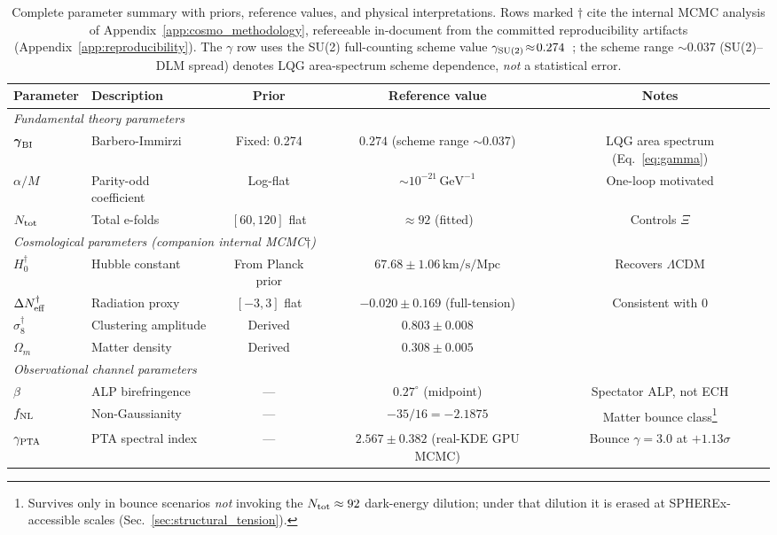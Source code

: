 \documentclass[aps,prd,twocolumn,superscriptaddress,showpacs,preprintnumbers,nofootinbib,longbibliography,floatfix]{revtex4-2}
\newcommand{\Neff}{N_{\rm eff}}
\newcommand{\fnl}{f_{\rm NL}}
\begin{document}
\begin{table}[t]
\caption{\label{tab:params} Complete parameter summary with priors, reference values,
and physical interpretations. Rows marked $\dagger$ cite the internal
MCMC analysis of Appendix~\ref{app:cosmo_methodology}, refereeable in-document
from the committed reproducibility artifacts (Appendix~\ref{app:reproducibility}).
The $\gamma$ row uses the SU(2) full-counting scheme value
$\gamma_{\rm SU(2)}\!\approx\!0.274$~\cite{Domagala2004,Meissner2004}; the scheme range
$\sim\!0.037$ (SU(2)--DLM spread) denotes LQG area-spectrum scheme dependence,
\emph{not} a statistical error.}
\begin{ruledtabular}
\begin{tabular}{llccc}
Parameter & Description & Prior & Reference value & Notes \\
\hline
\multicolumn{5}{l}{\textit{Fundamental theory parameters}} \\
$\boldsymbol{\gamma}_{\rm BI}$ & Barbero-Immirzi & Fixed: 0.274 & $0.274$ (scheme range $\sim\!0.037$) & LQG area spectrum (Eq.~\ref{eq:gamma}) \\
$\alpha/M$ & Parity-odd coefficient & Log-flat & $\sim 10^{-21}\,\text{GeV}^{-1}$ & One-loop motivated \\
$N_{\rm tot}$ & Total e-folds & $[60, 120]$ flat & $\approx 92$ (fitted) & Controls $\Xi$ \\
\hline
\multicolumn{5}{l}{\textit{Cosmological parameters (companion internal MCMC$\dagger$)}} \\
$H_0^\dagger$ & Hubble constant & From Planck prior & $67.68\pm 1.06\,\text{km/s/Mpc}$ & Recovers $\Lambda$CDM \\
$\Delta\Neff^\dagger$ & Radiation proxy & $[-3, 3]$ flat & $-0.020\pm 0.169$ (full-tension) & Consistent with 0 \\
$\sigma_8^\dagger$ & Clustering amplitude & Derived & $0.803\pm 0.008$ & \\
$\Omega_m$ & Matter density & Derived & $0.308\pm 0.005$ & \\
\hline
\multicolumn{5}{l}{\textit{Observational channel parameters}} \\
$\beta$ & ALP birefringence & --- & $0.27^\circ$ (midpoint) & Spectator ALP, not ECH \\
$\fnl$ & Non-Gaussianity & --- & $-35/16 = -2.1875$ & Matter bounce class\footnote{Survives only in bounce scenarios \emph{not} invoking the $N_{\rm tot}\approx 92$ dark-energy dilution; under that dilution it is erased at SPHEREx-accessible scales (Sec.~\ref{sec:structural_tension}).} \\
$\gamma_{\rm PTA}$ & PTA spectral index & --- & $2.567\pm 0.382$ (real-KDE GPU MCMC) & Bounce $\gamma=3.0$ at $+1.13\sigma$ \\
\end{tabular}
\end{ruledtabular}
\end{table}
\end{document}

